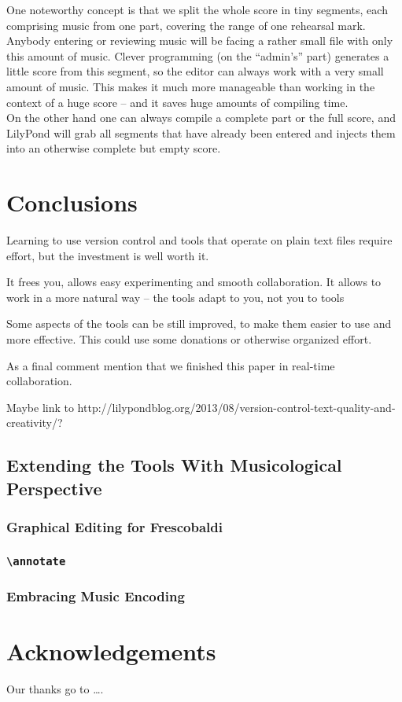 \documentclass[11pt,a4paper]{article}
\begin{document}
One noteworthy concept is that we split the whole score in tiny segments, each comprising
music from one part, covering the range of one rehearsal mark. Anybody entering or
reviewing music will be facing a rather small file with only this amount of music.
Clever programming (on the “admin's” part) generates a little score from this segment, so
the editor can always work with a very small amount of music. This makes it much more
manageable than working in the context of a huge score -- and it saves huge amounts of
compiling time.\\
On the other hand one can always compile a complete part or the full score, and LilyPond
will grab all segments that have already been entered and injects them into an otherwise
complete but empty score.

\section{Conclusions}\label{sec:conclusions}

Learning to use version control and tools that operate on plain text files require
effort, but the investment is well worth it.  

It frees you, allows easy experimenting and smooth collaboration.  It allows to work in a more natural way -- the tools adapt to you, not you to tools

Some aspects of the tools can be still improved, to make them easier to use and more
effective.  This could use some donations or otherwise organized effort.

As a final comment mention that we finished this paper in real-time collaboration.

Maybe link to http://lilypondblog.org/2013/08/version-control-text-quality-and-creativity/?


\subsection{Extending the Tools With Musicological Perspective}

\subsubsection{Graphical Editing for Frescobaldi}

\subsubsection{\texttt{\textbackslash annotate}}

\subsubsection{Embracing Music Encoding}



\section{Acknowledgements}

Our thanks go to \ldots .
\end{document}
